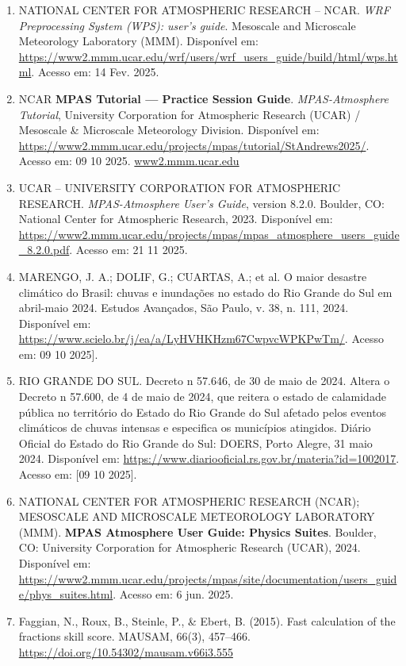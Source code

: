 \documentclass[12pt,a4paper,oneside]{book}
\begin{document}
\begin{enumerate}
\item
  NATIONAL CENTER FOR ATMOSPHERIC RESEARCH -- NCAR. \emph{WRF Preprocessing System (WPS): user's guide}. Mesoscale and Microscale Meteorology Laboratory (MMM). Disponível em: \url{https://www2.mmm.ucar.edu/wrf/users/wrf_users_guide/build/html/wps.html}. Acesso em: 14 Fev. 2025.
\item
  NCAR \textbf{MPAS Tutorial --- Practice Session Guide}. \emph{MPAS-Atmosphere Tutorial}, University Corporation for Atmospheric Research (UCAR) / Mesoscale \& Microscale Meteorology Division. Disponível em: \url{https://www2.mmm.ucar.edu/projects/mpas/tutorial/StAndrews2025/}. Acesso em: 09 10 2025. \href{https://www2.mmm.ucar.edu/projects/mpas/tutorial/StAndrews2025/?utm_source=chatgpt.com}{www2.mmm.ucar.edu}
\item
  UCAR -- UNIVERSITY CORPORATION FOR ATMOSPHERIC RESEARCH. \emph{MPAS-Atmosphere User's Guide}, version 8.2.0. Boulder, CO: National Center for Atmospheric Research, 2023. Disponível em: \url{https://www2.mmm.ucar.edu/projects/mpas/mpas_atmosphere_users_guide_8.2.0.pdf}. Acesso em: 21 11 2025.
\item
  MARENGO, J. A.; DOLIF, G.; CUARTAS, A.; et al. O maior desastre climático do Brasil: chuvas e inundações no estado do Rio Grande do Sul em abril-maio 2024. Estudos Avançados, São Paulo, v. 38, n. 111, 2024. Disponível em: \url{https://www.scielo.br/j/ea/a/LyHVHKHzm67CwpvcWPKPwTm/}. Acesso em: 09 10 2025{]}.
\item
  RIO GRANDE DO SUL. Decreto n\textordmasculine{} 57.646, de 30 de maio de 2024. Altera o Decreto n\textordmasculine{} 57.600, de 4 de maio de 2024, que reitera o estado de calamidade pública no território do Estado do Rio Grande do Sul afetado pelos eventos climáticos de chuvas intensas e especifica os municípios atingidos. Diário Oficial do Estado do Rio Grande do Sul: DOERS, Porto Alegre, 31 maio 2024. Disponível em: \url{https://www.diariooficial.rs.gov.br/materia?id=1002017}. Acesso em: {[}09 10 2025{]}.
\item
  NATIONAL CENTER FOR ATMOSPHERIC RESEARCH (NCAR); MESOSCALE AND MICROSCALE METEOROLOGY LABORATORY (MMM). \textbf{MPAS Atmosphere User Guide: Physics Suites}. Boulder, CO: University Corporation for Atmospheric Research (UCAR), 2024. Disponível em: \url{https://www2.mmm.ucar.edu/projects/mpas/site/documentation/users_guide/phys_suites.html}. Acesso em: 6 jun. 2025.
\item
  Faggian, N., Roux, B., Steinle, P., \& Ebert, B. (2015). Fast calculation of the fractions skill score. MAUSAM, 66(3), 457--466. \url{https://doi.org/10.54302/mausam.v66i3.555}

\end{enumerate}
\end{document}
